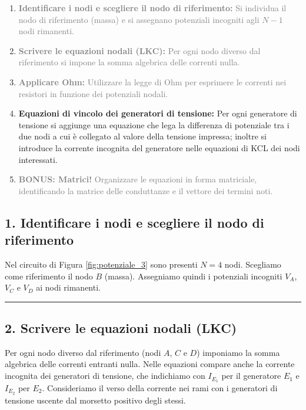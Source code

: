 \begin{enumerate}
    \item[1.] \textcolor{gray}{\textbf{Identificare i nodi e scegliere il nodo di riferimento:} Si individua il nodo di riferimento (massa) e si assegnano potenziali incogniti agli \(N-1\) nodi rimanenti.}
    \item[2.] \textcolor{gray}{\textbf{Scrivere le equazioni nodali (LKC):} Per ogni nodo diverso dal riferimento si impone la somma algebrica delle correnti nulla.}
    \item[3.] \textcolor{gray}{\textbf{Applicare Ohm:} Utilizzare la legge di Ohm per esprimere le correnti nei resistori in funzione dei potenziali nodali.}
    \item[3.1.] \textbf{Equazioni di vincolo dei generatori di tensione:} Per ogni generatore di tensione si aggiunge una equazione che lega la differenza di potenziale tra i due nodi a cui è collegato al valore della tensione impressa; inoltre si introduce la corrente incognita del generatore nelle equazioni di KCL dei nodi interessati.
    \item[4.] \textcolor{gray}{\textbf{BONUS: Matrici!} Organizzare le equazioni in forma matriciale, identificando la matrice delle conduttanze e il vettore dei termini noti.}
\end{enumerate}

\subsection*{1. Identificare i nodi e scegliere il nodo di riferimento}

Nel circuito di Figura \ref{fig:potenziale_3} sono presenti \(N=4\) nodi. Scegliamo come riferimento il nodo \(B\) (massa). Assegniamo quindi i potenziali incogniti \(V_A\), \(V_C\) e \(V_D\) ai nodi rimanenti.


\hrule
\subsection*{2. Scrivere le equazioni nodali (LKC)}

Per ogni nodo diverso dal riferimento (nodi \(A\), \(C\) e \(D\)) imponiamo la somma algebrica delle correnti entranti nulla. Nelle equazioni compare anche la corrente incognita dei generatori di tensione, che indichiamo con \(I_{E_1}\) per il generatore \(E_1\) e \(I_{E_2}\) per \(E_2\). Consideriamo il verso della corrente nei rami con i generatori di tensione uscente dal morsetto positivo degli stessi.


